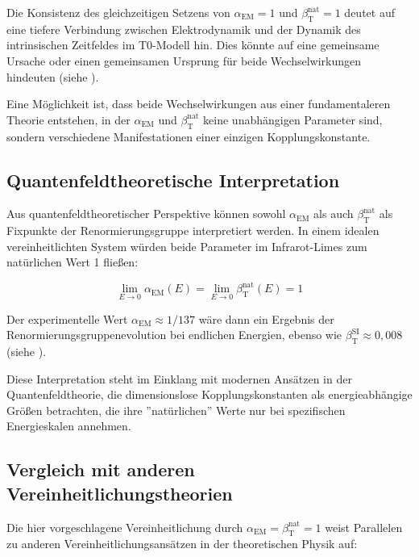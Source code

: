 \documentclass[12pt,a4paper]{article}
\newcommand{\alphaEM}{\alpha_{\text{EM}}}
\newcommand{\betaT}{\beta_{\text{T}}}
\begin{document}
	Die Konsistenz des gleichzeitigen Setzens von \(\alphaEM = 1\) und \(\betaT^{\text{nat}} = 1\) deutet auf eine tiefere Verbindung zwischen Elektrodynamik und der Dynamik des intrinsischen Zeitfeldes im T0-Modell hin. Dies könnte auf eine gemeinsame Ursache oder einen gemeinsamen Ursprung für beide Wechselwirkungen hindeuten (siehe \cite{pascher_feldtheorie_2025}).
	
	Eine Möglichkeit ist, dass beide Wechselwirkungen aus einer fundamentaleren Theorie entstehen, in der \(\alphaEM\) und \(\betaT^{\text{nat}}\) keine unabhängigen Parameter sind, sondern verschiedene Manifestationen einer einzigen Kopplungskonstante.
	
	\subsection{Quantenfeldtheoretische Interpretation}
	\label{subsec:qft_interpretation}
	
	Aus quantenfeldtheoretischer Perspektive können sowohl \(\alphaEM\) als auch \(\betaT^{\text{nat}}\) als Fixpunkte der Renormierungsgruppe interpretiert werden. In einem idealen vereinheitlichten System würden beide Parameter im Infrarot-Limes zum natürlichen Wert 1 fließen:
	
	\begin{equation}
		\lim_{E \to 0} \alphaEM(E) = \lim_{E \to 0} \betaT^{\text{nat}}(E) = 1
	\end{equation}
	
	Der experimentelle Wert \(\alphaEM \approx 1/137\) wäre dann ein Ergebnis der Renormierungsgruppenevolution bei endlichen Energien, ebenso wie \(\betaT^{\text{SI}} \approx 0,008\) (siehe \cite{pascher_erweiterung_2025}).
	
	Diese Interpretation steht im Einklang mit modernen Ansätzen in der Quantenfeldtheorie, die dimensionslose Kopplungskonstanten als energieabhängige Größen betrachten, die ihre ''natürlichen'' Werte nur bei spezifischen Energieskalen annehmen.
	
	\subsection{Vergleich mit anderen Vereinheitlichungstheorien}
	\label{subsec:comparison}
	
	Die hier vorgeschlagene Vereinheitlichung durch \(\alphaEM = \betaT^{\text{nat}} = 1\) weist Parallelen zu anderen Vereinheitlichungsansätzen in der theoretischen Physik auf:
	
\end{document}
